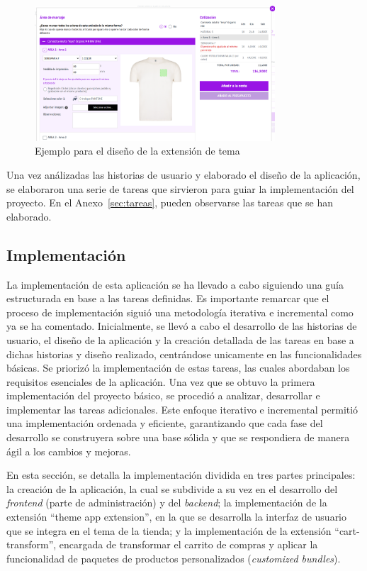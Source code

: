 \documentclass[11pt]{article}
\begin{document}
\begin{figure}[H]
    \centering
    \includegraphics[width=0.8\textwidth]{imagenes-diseño/diseñoPersonalizador.png}
    \caption{\label{fig:disenoExtension}Ejemplo para el diseño de la extensión de tema}
    \vspace{\fill}
\end{figure}

Una vez análizadas las historias de usuario y elaborado el diseño de la aplicación, se elaboraron una serie de tareas que sirvieron para guiar la implementación del proyecto.
En el Anexo~\ref{sec:tareas}, pueden observarse las tareas que se han elaborado.

\clearpage
\subsection{Implementación}
La implementación de esta aplicación se ha llevado a cabo siguiendo una guía estructurada en base a las tareas definidas.
Es importante remarcar que el proceso de implementación siguió una metodología iterativa e incremental como ya se ha comentado. Inicialmente, se llevó a cabo el desarrollo
de las historias de usuario, el diseño de la aplicación y la creación detallada de las tareas en base a dichas historias y diseño realizado, centrándose unicamente en las funcionalidades básicas. Se priorizó
la implementación de estas tareas, las cuales abordaban los requisitos esenciales de la aplicación. Una vez que se obtuvo la primera implementación del
proyecto básico, se procedió a analizar, desarrollar e implementar las tareas adicionales. Este enfoque iterativo e incremental permitió una implementación
ordenada y eficiente, garantizando que cada fase del desarrollo se construyera sobre una base sólida y que se respondiera de manera ágil a los cambios y mejoras.

En esta sección, se detalla la implementación dividida en tres partes principales: la creación de la aplicación, 
la cual se subdivide a su vez en el desarrollo del \textit{frontend} (parte de administración) y del \textit{backend}; la implementación de la extensión 
``theme app extension'', en la que se desarrolla la interfaz de usuario que se integra en el tema de la tienda; y la implementación de 
la extensión ``cart-transform'', encargada de transformar el carrito de compras y aplicar la funcionalidad de paquetes de productos 
personalizados (\textit{customized bundles}).
\end{document}

